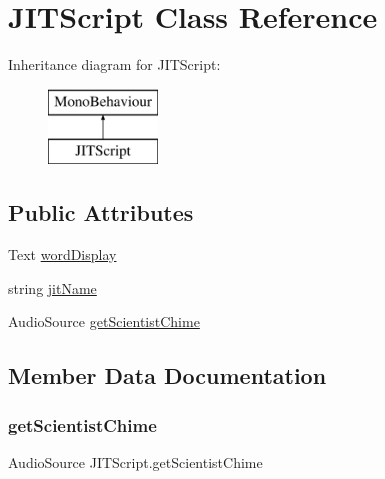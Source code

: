 \hypertarget{class_j_i_t_script}{}\section{J\+I\+T\+Script Class Reference}
\label{class_j_i_t_script}
Inheritance diagram for J\+I\+T\+Script\+:\begin{figure}[H]
\begin{center}
\leavevmode
\includegraphics[height=2.000000cm]{class_j_i_t_script}
\end{center}
\end{figure}
\subsection*{Public Attributes}
\begin{DoxyCompactItemize}
\item 
Text \hyperlink{class_j_i_t_script_a033821b78a287d85204d336682fc6ee2}{word\+Display}
\item 
string \hyperlink{class_j_i_t_script_a47cba90f798093a7568d746789846520}{jit\+Name}
\item 
Audio\+Source \hyperlink{class_j_i_t_script_a3d065d627b861465a7c4da4c1ca9fdfd}{get\+Scientist\+Chime}
\end{DoxyCompactItemize}


\subsection{Member Data Documentation}
\mbox{\label{class_j_i_t_script_a3d065d627b861465a7c4da4c1ca9fdfd}} 
\subsubsection{\texorpdfstring{get\+Scientist\+Chime}{getScientistChime}}
{\footnotesize\ttfamily Audio\+Source J\+I\+T\+Script.\+get\+Scientist\+Chime}

\mbox{\label{class_j_i_t_script_a47cba90f798093a7568d746789846520}} 
